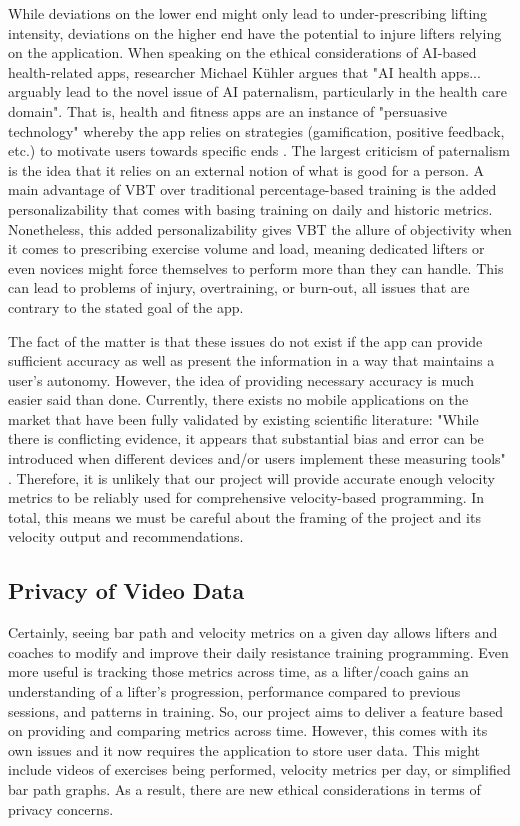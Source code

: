 \documentclass[10pt,twocolumn]{article}
\begin{document}
While deviations on the lower end might only lead to under-prescribing lifting intensity, deviations on the higher end have the potential to injure lifters relying on the application. 
When speaking on the ethical considerations of AI-based health-related apps, researcher Michael Kühler argues that "AI health apps... arguably lead to the novel issue of AI paternalism, particularly in the health care domain". 
That is, health and fitness apps are an instance of "persuasive technology" whereby the app relies on strategies (gamification, positive feedback, etc.) to motivate users towards specific ends \cite{Kuhler2022}. 
The largest criticism of paternalism is the idea that it relies on an external notion of what is good for a person. 
A main advantage of VBT over traditional percentage-based training is the added personalizability that comes with basing training on daily and historic metrics.
Nonetheless, this added personalizability gives VBT the allure of objectivity when it comes to prescribing exercise volume and load, meaning dedicated lifters or even novices might force themselves to perform more than they can handle.
This can lead to problems of injury, overtraining, or burn-out, all issues that are contrary to the stated goal of the app.\par

The fact of the matter is that these issues do not exist if the app can provide sufficient accuracy as well as present the information in a way that maintains a user's autonomy. 
However, the idea of providing necessary accuracy is much easier said than done.
Currently, there exists no mobile applications on the market that have been fully validated by existing scientific literature: "While there is conflicting evidence, it appears that substantial bias and error can be introduced when different devices and/or users implement these measuring tools" \cite{Weakley2021}. 
Therefore, it is unlikely that our project will provide accurate enough velocity metrics to be reliably used for comprehensive velocity-based programming. 
In total, this means we must be careful about the framing of the project and its velocity output and recommendations.

\subsection{Privacy of Video Data}
Certainly, seeing bar path and velocity metrics on a given day allows lifters and coaches to modify and improve their daily resistance training programming.
Even more useful is tracking those metrics across time, as a lifter/coach gains an understanding of a lifter's progression, performance compared to previous sessions, and patterns in training.
So, our project aims to deliver a feature based on providing and comparing metrics across time. 
However, this comes with its own issues and it now requires the application to store user data. 
This might include videos of exercises being performed, velocity metrics per day, or simplified bar path graphs. 
As a result, there are new ethical considerations in terms of privacy concerns. \par
\end{document}
